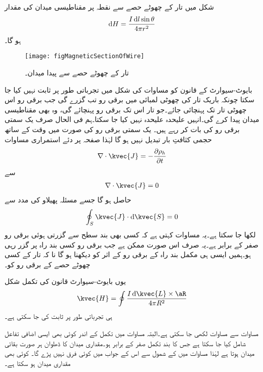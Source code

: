 شکل  میں تار کے چھوٹے حصے  سے نقطہ  پر مقناطیسی میدان کی مقدار
\begin{align}\label{مساوات_مقناطیسی_تار_کا_ٹکڑا_اور_میدان}
\dif H=\frac{I \dif l \sin \theta}{4\pi r^2}
\end{align}
ہو گا۔

\begin{figure}
\centering
\texttt{[image: figMagneticSectionOfWire]}
\caption{تار کے چھوٹے حصے سے پیدا میدان۔}
\label{شکل_مقناطیسی_تار_کا_ٹکڑا_اور_میدان}
\end{figure}
بایوٹ-سیوارٹ کے قانون کو مساوات  کی شکل میں تجرباتی طور پر ثابت نہیں کیا جا سکتا چونکہ باریک تار کی چھوٹی لمبائی میں برقی رو تب گزرے گی جب برقی رو اس چھوٹی تار تک پہنچائی جائے۔جو تار اس تک برقی رو پہنچائے گی، وہ بھی مقناطیسی میدان پیدا کرے گی۔انہیں علیحدہ علیحدہ نہیں کیا جا سکتا۔ہم فی الحال صرف یک سمتی برقی رو کی بات کر رہے ہیں۔ یک سمتی برقی رو کی صورت میں وقت کے ساتھ حجمی کثافتِ بار تبدیل نہیں ہو گا لہٰذا صفحہ  پر دئے  استمراری مساوات
\begin{align*}
\nabla \cdot \kvec{J}=-\frac{\partial \rho_h}{\partial t}
\end{align*}
سے
\begin{align}\label{مساوات_مقناطیسی_صرف_مکمل_بند_راہ}
\nabla \cdot \kvec{J}=0
\end{align}
حاصل ہو گا جسے مسئلہ پھیلاو کی مدد سے
\begin{align*}
\oint_S  \kvec{J} \cdot \dif \kvec{S}=0
\end{align*}
لکھا جا سکتا ہے۔یہ مساوات کہتی ہے کہ کسی بھی بند سطح سے گزرتی ہوئی برقی رو صفر کے برابر ہے۔یہ صرف اس صورت ممکن ہے جب برقی رو کسی بند راہ پر گزر رہی ہو۔ہمیں ایسی ہی مکمل بند راہ کے برقی رو کے اثر کو دیکھنا ہو گا نا کہ تار کے کسی چھوٹے حصے  کے برقی رو کو۔ 

یوں بایوٹ-سیوارٹ قانون کی تکمل شکل
\begin{align}\label{مساوات_بایوٹ_سیوارٹ_تکمل_شکل}
\kvec{H}=\oint \frac{I \dif \kvec{L} \times \aR}{4 \pi R^2}
\end{align}
ہی تجرباتی طور پر ثابت کی جا سکتی ہے۔

مساوات  سے مساوات  لکھی جا سکتی ہے۔البتہ مساوات  میں تکمل کے اندر کوئی بھی ایسی اضافی تفاعل شامل کیا جا سکتا ہے جس کا بند تکمل صفر کے برابر ہو۔مقداری میدان کا ڈھلوان ہر صورت بقائی میدان ہوتا ہے لہٰذا مساوات  میں  کے شمول سے اس کے جواب میں کوئی فرق نہیں پڑے گا۔ کوئی بھی مقداری میدان ہو سکتا ہے۔

